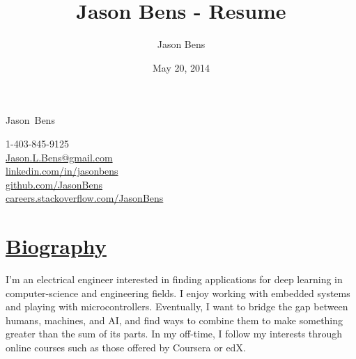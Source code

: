 \documentclass[a4paper, 11pt]{article}
\title{Jason Bens - Resume}
\author{Jason Bens}
\date{May 20, 2014}
\makeatletter
\newcommand {\firstname} {Jason}
\newcommand {\lastname} {Bens}
\newcommand {\phone} {\mbox{1-403-845-9125}}
\newcommand {\email} {\url{Jason.L.Bens@gmail.com}}
\newcommand {\linkedin} {\url{linkedin.com/in/jasonbens}}
\newcommand {\github} {\url{github.com/JasonBens}}
\newcommand {\careers} {\url{careers.stackoverflow.com/JasonBens}}
\makeatother
\begin{document}


\begin{minipage}[t]{0.4\textwidth}  
  \begin{flushright}
    {\Huge \firstname~\lastname}
  \end{flushright}
\end{minipage}
\hfill
\begin{minipage}{0.42\textwidth}
  \begin{flushright}
    \phone \\
    \email \\
    \linkedin \\
    \github \\
    \careers \\
  \end{flushright}
\end{minipage}

\hrulefill

\section{\underline{Biography}}
I'm an electrical engineer interested in finding applications for deep learning in computer-science and engineering fields. I enjoy working with embedded systems and playing with microcontrollers. Eventually, I want to bridge the gap between humans, machines, and AI, and find ways to combine them to make something greater than the sum of its parts. In my off-time, I follow my interests through online courses such as those offered by Coursera or edX.

\end{document}
